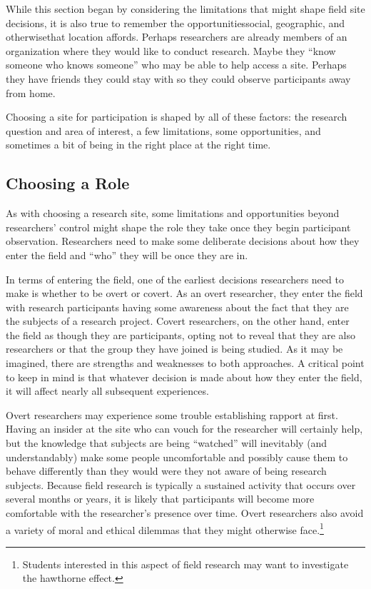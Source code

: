 While this section began by considering the limitations that might shape field site decisions, it is also true to remember the opportunities\textemdash social, geographic, and otherwise\textemdash that location affords. Perhaps researchers are already members of an organization where they would like to conduct research. Maybe they ``know someone who knows someone'' who may be able to help access a site. Perhaps they have friends they could stay with so they could observe participants away from home. 

Choosing a site for participation is shaped by all of these factors: the research question and area of interest, a few limitations, some opportunities, and sometimes a bit of being in the right place at the right time.

\subsection{Choosing a Role}

As with choosing a research site, some limitations and opportunities beyond researchers' control might shape the role they take once they begin participant observation. Researchers need to make some deliberate decisions about how they enter the field and ``who'' they will be once they are in.

In terms of entering the field, one of the earliest decisions researchers need to make is whether to be overt or covert. As an overt researcher, they enter the field with research participants having some awareness about the fact that they are the subjects of a research project. Covert researchers, on the other hand, enter the field as though they are participants, opting not to reveal that they are also researchers or that the group they have joined is being studied. As it may be imagined, there are strengths and weaknesses to both approaches. A critical point to keep in mind is that whatever decision is made about how they enter the field, it will affect nearly all subsequent experiences.

Overt researchers may experience some trouble establishing rapport at first. Having an insider at the site who can vouch for the researcher will certainly help, but the knowledge that subjects are being ``watched'' will inevitably (and understandably) make some people uncomfortable and possibly cause them to behave differently than they would were they not aware of being research subjects. Because field research is typically a sustained activity that occurs over several months or years, it is likely that participants will become more comfortable with the researcher's presence over time. Overt researchers also avoid a variety of moral and ethical dilemmas that they might otherwise face.\footnote{Students interested in this aspect of field research may want to investigate the \Gls{hawthorne} effect.}

